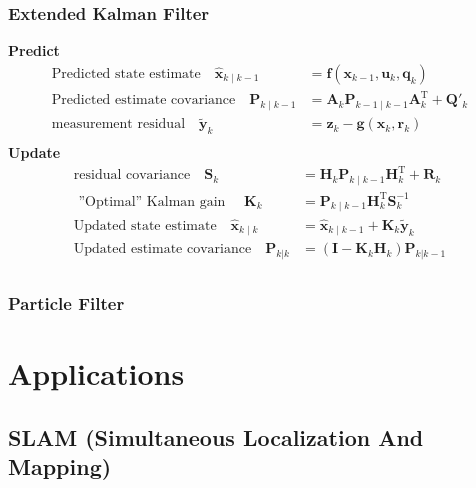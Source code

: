 \documentclass[14pt,hyperref={CJKbookmarks=true}]{beamer}
\theoremstyle{plain}
\theoremstyle{definition}
\theoremstyle{remark}
\begin{document}
\begin{frame}
\small
\frametitle{Extended Kalman Filter}{}
\small
{\bf{Predict}}
\begin{equation*}
\begin{split}
\text{Predicted state estimate} \quad \hat{\mathbf{x}}_{k\mid k-1} &= \mathbf{f}(\mathbf{x}_{k-1},\mathbf{u}_{k},\mathbf{q}_{k})\\
\text{Predicted estimate covariance} \quad\mathbf{P}_{k\mid k-1} &=  \mathbf{A}_k \mathbf{P}_{k-1\mid k-1} \mathbf{A}_k^\mathrm{T} + \mathbf{Q}'_k\\
\text{measurement residual}\quad \tilde{\mathbf{y}}_k &= \mathbf{z}_k - \mathbf{g}(\mathbf{x}_k,\mathbf{r}_k)\\
\end{split}
\end{equation*}
\pause
{\bf{Update}}
\begin{equation*}
\begin{split}
\text{residual covariance}\quad\mathbf{S}_k& = \mathbf{H}_k \mathbf{P}_{k\mid k-1} \mathbf{H}_k^\mathrm{T} + \mathbf{R}_k \\
\text{ ''Optimal'' Kalman gain }\quad \mathbf{K}_k &= \mathbf{P}_{k\mid k-1}\mathbf{H}_k^\mathrm{T} \mathbf{S}_k^{-1}\\
\text{Updated state estimate}\quad \hat{\mathbf{x}}_{k\mid k} &= \hat{\mathbf{x}}_{k\mid k-1} + \mathbf{K}_k\tilde{\mathbf{y}}_k\\
\text{Updated estimate covariance}\quad\mathbf{P}_{k|k} &= (\mathbf{I} - \mathbf{K}_k \mathbf{H}_k) \mathbf{P}_{k|k-1} \\
\end{split}
\end{equation*}
\end{frame}

\begin{frame}
\small
\frametitle{Particle Filter}

\end{frame}
\section{Applications}
\frame{\tableofcontents[currentsection]}
\subsection{SLAM (Simultaneous Localization And Mapping)}
\end{document}
